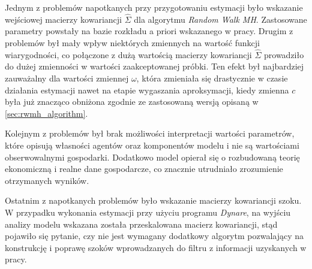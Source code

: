 Jednym z problemów napotkanych przy przygotowaniu estymacji było wskazanie wejściowej macierzy kowariancji $\hat{\Sigma}$ dla algorytmu \emph{Random Walk MH}. Zastosowane parametry powstały na bazie rozkładu a priori wskazanego w pracy. Drugim z problemów był mały wpływ niektórych zmiennych na wartość funkcji wiarygodności, co połączone z dużą wartością macierzy kowariancji $\hat{\Sigma}$ prowadziło do dużej zmienności w wartości zaakceptowanej próbki. Ten efekt był najbardziej zauważalny dla wartości zmiennej $\omega$, która zmieniała się drastycznie w czasie działania estymacji nawet na etapie wygaszania aproksymacji, kiedy zmienna $c$ była już znacząco obniżona zgodnie ze zastosowaną wersją opisaną w \ref{sec:rwmh_algorithm}.

Kolejnym z problemów był brak możliwości interpretacji wartości parametrów, które opisują własności agentów oraz komponentów modelu i nie są wartościami obserwowalnymi gospodarki. Dodatkowo model opierał się o rozbudowaną teorię ekonomiczną i realne dane gospodarcze, co znacznie utrudniało zrozumienie otrzymanych wyników. 

Ostatnim z napotkanych problemów było wskazanie macierzy kowariancji szoku. W przypadku wykonania estymacji przy użyciu programu \emph{Dynare}, na wyjściu analizy modelu wskazana została przeskalowana macierz kowariancji, stąd pojawiło się pytanie, czy nie jest wymagany dodatkowy algorytm pozwalający na konstrukcję i poprawę szoków wprowadzanych do filtru z informacji uzyskanych w pracy. 

